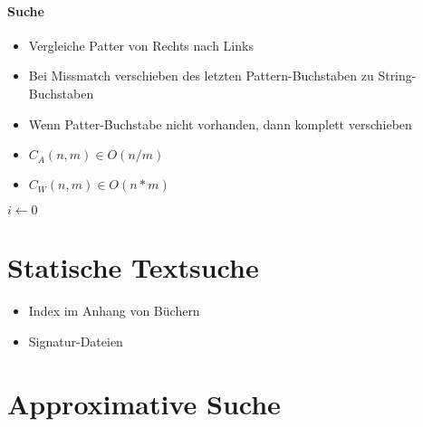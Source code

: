 \paragraph{Suche}
\begin{itemize}
  \item Vergleiche Patter von Rechts nach Links
  \item Bei Missmatch verschieben des letzten Pattern-Buchstaben zu String-Buchstaben
  \item Wenn Patter-Buchstabe nicht vorhanden, dann komplett verschieben
  \item $C_A(n,m) \in O(n/m)$
  \item $C_W(n,m) \in O(n * m)$
\end{itemize}

\begin{algorithm}[H]


  $i \leftarrow 0$

\end{algorithm}


\section{Statische Textsuche}

\begin{itemize}
  \item Index im Anhang von Büchern
  \item Signatur-Dateien
\end{itemize}

\section{Approximative Suche}

